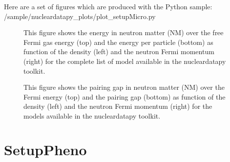 \documentclass[letterpaper,10pt,english]{sphinxmanual}
\begin{document}
\sphinxAtStartPar
Here are a set of figures which are produced with the Python sample: /sample/nucleardatapy\_plots/plot\_setupMicro.py

\begin{figure}[htbp]
\centering
\capstart

\noindent{}
\caption{This figure shows the energy in neutron matter (NM) over the free Fermi gas energy (top) and the energy per particle (bottom) as function of the density (left) and the neutron Fermi momentum (right) for the complete list of model available in the nucleardatapy toolkit.}\label{\detokenize{source/api/setup_micro:id1}}\end{figure}

\begin{figure}[htbp]
\centering
\capstart

\noindent{}
\caption{This figure shows the pairing gap in neutron matter (NM) over the Fermi energy (top) and the pairing gap (bottom) as function of the density (left) and the neutron Fermi momentum (right) for the models available in the nucleardatapy toolkit.}\label{\detokenize{source/api/setup_micro:id2}}\end{figure}

\sphinxstepscope


\section{SetupPheno}
\label{\detokenize{source/api/setup_pheno:setuppheno}}\label{\detokenize{source/api/setup_pheno::doc}}\label{\detokenize{source/api/setup_pheno:module-nucleardatapy.setup_pheno}}
\end{document}
